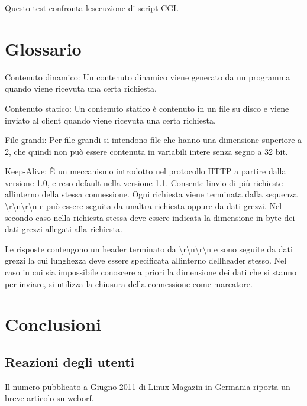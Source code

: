 \documentclass[a4paper,11pt]{article}
\begin{document}
{\sffamily
Questo test confronta l{\textquotesingle}esecuzione di script CGI.}


\bigskip

\section{Glossario}
{\sffamily
Contenuto dinamico: Un contenuto dinamico viene generato da un programma
quando viene ricevuta una certa richiesta.}


\bigskip

{\sffamily
Contenuto statico: Un contenuto statico \`e contenuto in un file su
disco e viene inviato al client quando viene ricevuta una certa
richiesta.}


\bigskip

{\sffamily
File grandi: Per file grandi si intendono file che hanno una dimensione
superiore a 2{\textthreesuperior}{\texttwosuperior}, che quindi non
pu\`o essere contenuta in variabili intere senza segno a 32 bit.}


\bigskip

{\sffamily
Keep-Alive: \`E un meccanismo introdotto nel protocollo HTTP a partire
dalla versione 1.0, e reso default nella versione 1.1. Consente
l{\textquotesingle}invio di pi\`u richieste
all{\textquotesingle}interno della stessa connessione. Ogni richiesta
viene terminata dalla sequenza
{\textquotedbl}{\textbackslash}r{\textbackslash}n{\textbackslash}r{\textbackslash}n{\textquotedbl}
e pu\`o essere seguita da un{\textquotesingle}altra richiesta oppure da
dati grezzi. Nel secondo caso nella richiesta stessa deve essere
indicata la dimensione in byte dei dati grezzi allegati alla
richiesta.}

{\sffamily
Le risposte contengono un header terminato da
{\textquotedbl}{\textbackslash}r{\textbackslash}n{\textbackslash}r{\textbackslash}n{\textquotedbl}
e sono seguite da dati grezzi la cui lunghezza deve essere specificata
all{\textquotesingle}interno dell{\textquotesingle}header stesso. Nel
caso in cui sia impossibile conoscere a priori la dimensione dei dati
che si stanno per inviare, si utilizza la chiusura della connessione
come marcatore.}


\bigskip

\section{Conclusioni}
\subsection{Reazioni degli utenti}
{\sffamily
Il numero pubblicato a Giugno 2011 di Linux Magazin in Germania riporta
un breve articolo su weborf\cite{LNK01}.}
\end{document}
